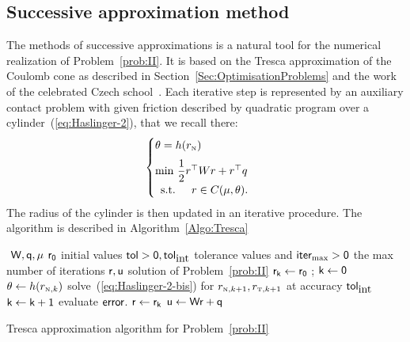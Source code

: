 \subsection{Successive approximation  method}
\label{Sec:Tresca-solver}
The methods of successive approximations is a natural tool for the numerical realization of Problem~\ref{prob:II}. It is based on the Tresca approximation of the Coulomb cone as described in Section~\ref{Sec:OptimisationProblems} and the work of the celebrated Czech school~\cite{Necas.ea1980,Haslinger1983,Haslinger1984,Haslinger.ea1996}.   Each iterative step is represented by an auxiliary contact problem with given friction described by quadratic program over a cylinder~(\ref{eq:Haslinger-2}), that we recall there:
\begin{equation}
  \label{eq:Haslinger-2-bis}
  \begin{cases}
    \theta = h(r_\n) \\[2mm]
    \min\, \Frac 1 2 r^\top W r + r^\top q \\
    \begin{array}{ll}
    \text{s.t. }& r \in C(\mu,\theta).
  \end{array}
  \end{cases}
\end{equation}
The radius of the cylinder is then updated in an iterative procedure.  The algorithm is described in Algorithm~\ref{Algo:Tresca}
\begin{algorithm}
  \begin{algorithmic}
    {\sf
      \STATE $ $ 
      \REQUIRE $\sf W,q,\mu$
      \REQUIRE $\sf r_0$ initial values
      \REQUIRE $\sf tol >0, tol_{\mbox{int}}$  tolerance values and $\sf iter_{\max}  >0$ the max number of iterations
      \ENSURE  $\sf r,u$ solution of Problem~\ref{prob:II}
      \STATE $\sf r_{k} \leftarrow r_0 $ ; $\sf k \leftarrow 0$ 
      \STATE $\theta \leftarrow h(r_{{\hbox{\tiny{N}}},k})$ 
      \STATE solve~(\ref{eq:Haslinger-2-bis}) for $r_{{\hbox{\tiny{N}}},k+1},r_{{\hbox{\tiny{T}}},k+1}$ at accuracy $\sf tol_{\mbox{int}}$
      \STATE $\sf k \leftarrow k+1$
      \STATE evaluate $\sf error$.
      \ENDWHILE
      \STATE $\sf r \leftarrow r_{k}$ 
      \STATE $\sf u \leftarrow W r + q$ 
    }
  \end{algorithmic}
  \caption{Tresca approximation algorithm for Problem~\ref{prob:II}}
  \label{Algo:Tresca}
\end{algorithm}

